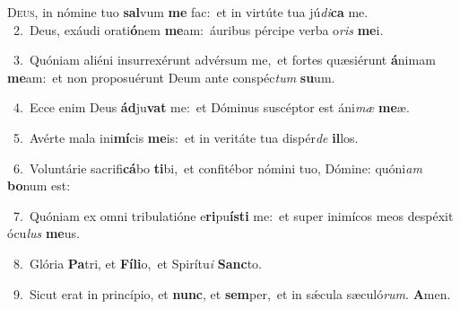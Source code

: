 \lettrine{\initial\textcolor{\initialcolor}{D}}{eus,} in nómine tuo \textbf{sal}\-vum \textbf{me} fac:~\star et in virtúte tua jú\-\textit{di}\-\textbf{ca} me.\\
{\numbfont\textcolor{\numbcolor}{~2.}}~Deus, exáudi orati\-\textbf{ó}\-nem \textbf{me}\-am:~\star áuribus pércipe verba o\textit{ris} \textbf{me}\-i.\par
{\numbfont\textcolor{\numbcolor}{~3.}}~Quóniam aliéni insurrexérunt advérsum me,~\dagger et fortes quæsiérunt \textbf{á}\-nimam \textbf{me}\-am:~\star et non proposuérunt Deum ante conspéc\textit{tum} \textbf{su}\-um.\par
{\numbfont\textcolor{\numbcolor}{~4.}}~Ecce enim Deus \textbf{ád}\-ju\textbf{vat} me:~\star et Dóminus suscéptor est áni\textit{mæ} \textbf{me}\-æ.\par
{\numbfont\textcolor{\numbcolor}{~5.}}~Avérte mala ini\-\textbf{mí}\-cis \textbf{me}\-is:~\star et in veritáte tua dispér\textit{de} \textbf{il}\-los.\par
{\numbfont\textcolor{\numbcolor}{~6.}}~Voluntárie sacrifi\-\textbf{cá}\-bo \textbf{ti}\-bi,~\star et confitébor nómini tuo, Dómine: quóni\textit{am} \textbf{bo}\-num est:\par
{\numbfont\textcolor{\numbcolor}{~7.}}~Quóniam ex omni tribulatióne e\-\textbf{ri}\-pu\-\textbf{ís}\-\textbf{ti} me:~\star et super inimícos meos despéxit ócu\textit{lus} \textbf{me}\-us.\par
{\numbfont\textcolor{\numbcolor}{~8.}}~Glória \textbf{Pa}\-tri, et \textbf{Fí}\-\textbf{li}o,~\star et Spirítu\textit{i} \textbf{Sanc}\-to.\par
{\numbfont\textcolor{\numbcolor}{~9.}}~Sicut erat in princípio, et \textbf{nunc}\-, et \textbf{sem}\-per,~\star et in sǽcula sæculó\-\textit{rum}\-. \textbf{A}\-men.\par
